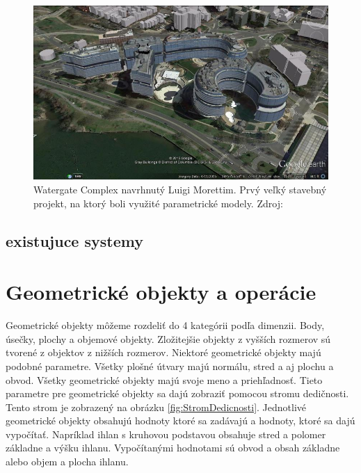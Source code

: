 \begin{figure}[H]
    \centering
    \includegraphics[width = \linewidth]{obrazky-figures/watergate-complex.jpg}
    \caption{Watergate Complex navrhnutý Luigi Morettim. Prvý veľký stavebný projekt, na ktorý boli využité parametrické modely. Zdroj: \cite{munger_2015}}
    \label{fig:Watergate}
\end{figure}





\section{existujuce systemy}



\chapter{Geometrické objekty a operácie}
\label{chapt:Geometrické_tvary}

Geometrické objekty môžeme rozdeliť do 4 kategórii podľa dimenzii. Body, úsečky, plochy a objemové objekty.
Zložitejšie objekty z vyšších rozmerov sú tvorené z objektov z nižších rozmerov. 
Niektoré geometrické objekty majú podobné parametre. Všetky plošné útvary majú normálu, stred a aj plochu a obvod. Všetky geometrické objekty majú svoje meno a priehľadnosť. Tieto parametre pre geometrické objekty sa dajú zobraziť pomocou stromu dedičnosti. Tento strom je zobrazený na obrázku \ref{fig:StromDedicnosti}. 
Jednotlivé geometrické objekty obsahujú hodnoty ktoré sa zadávajú a hodnoty, ktoré sa dajú vypočítať. Napríklad ihlan s kruhovou podstavou obsahuje stred a polomer základne a výšku ihlanu. Vypočítanými hodnotami sú obvod a obsah základne alebo objem a plocha ihlanu.  

